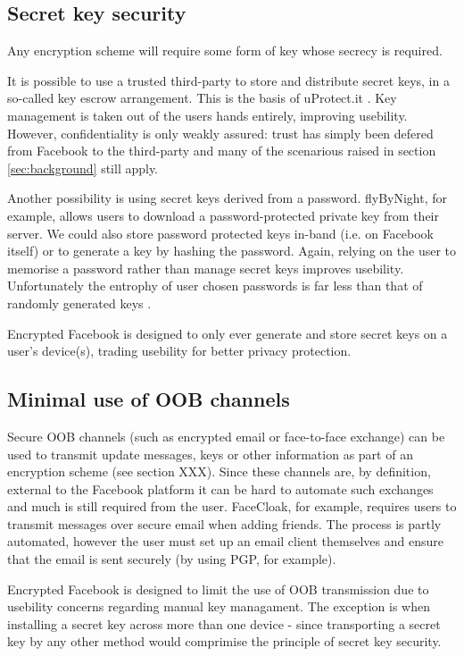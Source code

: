 \subsection{Secret key security}

Any encryption scheme will require some form of key whose secrecy is required.

It is possible to use a trusted third-party to store and distribute secret keys, in a so-called key escrow arrangement. This is the basis of uProtect.it \cite{uprotect}. Key management is taken out of the users hands entirely, improving usebility. However, confidentiality is only weakly assured: trust has simply been defered from Facebook to the third-party and many of the scenarious raised in section \ref{sec:background} still apply.

Another possibility is using secret keys derived from a password. flyByNight, for example, allows users to download a password-protected private key from their server. We could also store password protected keys in-band (i.e. on Facebook itself) or to generate a key by hashing the password. Again, relying on the user to memorise a password rather than manage secret keys improves usebility. Unfortunately the entrophy of user chosen passwords is far less than that of randomly generated keys \cite{password}.

Encrypted Facebook is designed to only ever generate and store secret keys on a user's device(s), trading usebility for better privacy protection.


\subsection{Minimal use of OOB channels}

Secure \ac{OOB} channels (such as encrypted email or face-to-face exchange) can be used to transmit update messages, keys or other information as part of an encryption scheme (see section XXX). Since these channels are, by definition, external to the Facebook platform it can be hard to automate such exchanges and much is still required from the user. FaceCloak, for example, requires users to transmit messages over secure email when adding friends. The process is partly automated, however the user must set up an email client themselves and ensure that the email is sent securely (by using PGP, for example).

Encrypted Facebook is designed to limit the use of \ac{OOB} transmission due to usebility concerns regarding manual key managament. The exception is when installing a secret key across more than one device - since transporting a secret key by any other method would comprimise the principle of secret key security.


